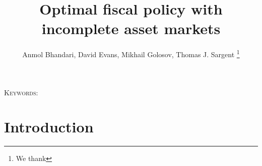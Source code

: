 \documentclass[12pt]{article}
\title{Optimal fiscal policy with incomplete asset markets}
\author{Anmol Bhandari, David Evans, Mikhail Golosov, Thomas J. Sargent
\thanks{We thank }}
\begin{document}
\maketitle



\begin{abstract}


\end{abstract}


\noindent\textsc{Keywords:} 
\section{Introduction}




\end{document}
